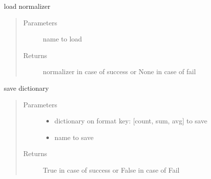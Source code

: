 \documentclass[letterpaper,10pt,english]{sphinxmanual}
\begin{document}
\begin{fulllineitems}
\label{\detokenize{algorithms:repository.repository_service.load_normalizer}}
\sphinxAtStartPar
load normalizer
\begin{quote}\begin{description}
\item[{Parameters}] \leavevmode
\sphinxAtStartPar
{} \textendash{} name to load

\item[{Returns}] \leavevmode
\sphinxAtStartPar
normalizer in case of success or None in case of fail

\end{description}\end{quote}

\end{fulllineitems}


\begin{fulllineitems}
\label{\detokenize{algorithms:repository.repository_service.save_carriers}}
\sphinxAtStartPar
save dictionary
\begin{quote}\begin{description}
\item[{Parameters}] \leavevmode\begin{itemize}
\item {} 
\sphinxAtStartPar
{} \textendash{} dictionary on format key: {[}count, sum, avg{]} to save

\item {} 
\sphinxAtStartPar
{} \textendash{} name to save

\end{itemize}

\item[{Returns}] \leavevmode
\sphinxAtStartPar
True in case of success or False in case of Fail

\end{description}\end{quote}

\end{fulllineitems}
\end{document}
